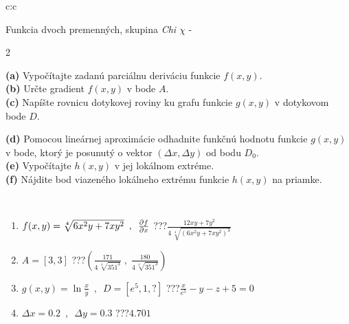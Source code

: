 \documentclass[10pt]{report}
\begin{document}
\begin{tabular}{c:c}
\begin{minipage}[c][104.5mm][t]{0.5\linewidth}
\begin{center}
\vspace{7mm}
{\huge \LARGE Funkcia dvoch premenných, skupina \textit{Chi $\chi$} -}\\[5mm]
\begin{minipage}{0.95\linewidth}
\begin{center}
{\small \begin{multicols}{2} \raggedright
\textbf{(a)} Vypočítajte zadanú parciálnu deriváciu funkcie \(f(x,y)\). \\[1mm]
\textbf{(b)} Určte gradient \(f(x,y)\) v bode \(A\). \\[1mm]
\textbf{(c)} Napíšte rovnicu dotykovej roviny ku grafu funkcie \(g(x,y)\) v dotykovom bode \(D\). \par \columnbreak
\textbf{(d)} Pomocou lineárnej aproximácie odhadnite funkčnú hodnotu funkcie \(g(x,y)\) v bode, ktorý je posunutý o vektor \((\Delta x, \Delta y)\) od bodu \(D_0\). \\[1mm]
\textbf{(e)} Vypočítajte \(h(x,y)\) v jej lokálnom extréme. \\[1mm]
\textbf{(f)} Nájdite bod viazeného lokálneho extrému funkcie \(h(x,y)\) na priamke. \\[1mm]
\end{multicols}
}
\end{center}
\end{minipage}
\\[4mm]
\begin{minipage}{0.79\linewidth}
\begin{center}
\begin{varwidth}{\linewidth}
\begin{enumerate}
\normalsizerr
\item $f(x,y) = \sqrt[4]{6x^2y + 7xy^2}\enspace , \enspace \pdv{f}{x}$\quad \dotfill\; ???\;\dotfill \quad $\frac{12xy+7y^2}{4\,\sqrt[4]{(6x^2y+7xy^2)^{3}}}$
\item $A = [3, 3]$\quad \dotfill\; ???\;\dotfill \quad $\left( \frac{171}{4\,\sqrt[4]{351^3}} \;,\; \frac{180}{4\,\sqrt[4]{351^3}} \right)$
\item $g(x,y) = \ln\frac{x}{y} \enspace , \enspace D=[e^{5},1,?]$\quad \dotfill\; ???\;\dotfill \quad $\frac{x}{e^5} - y - z + 5 = 0$
\item $\Delta x = {0.2} \enspace,\enspace \Delta y = {0.3}$\quad \dotfill\; ???\;\dotfill \quad $4.701$

\end{enumerate}
\end{varwidth}
\end{center}
\end{minipage}
\end{center}
\end{minipage}
\end{tabular}
\end{document}
